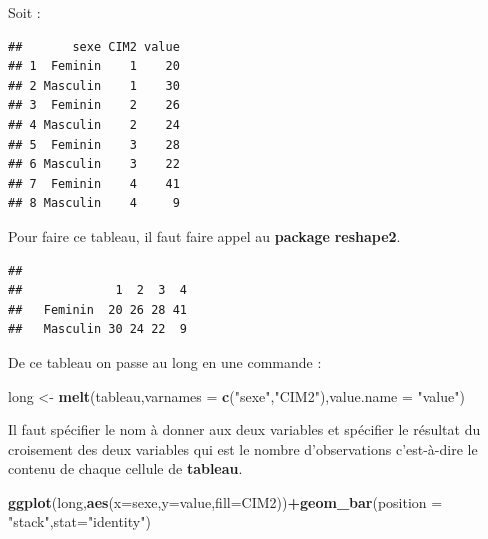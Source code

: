 \documentclass[
]{book}
\newenvironment{Shaded}{\begin{snugshade}}{\end{snugshade}}
\newcommand{\AttributeTok}[1]{\textcolor[rgb]{0.13,0.29,0.53}{#1}}
\newcommand{\FunctionTok}[1]{\textcolor[rgb]{0.13,0.29,0.53}{\textbf{#1}}}
\newcommand{\NormalTok}[1]{#1}
\newcommand{\OtherTok}[1]{\textcolor[rgb]{0.56,0.35,0.01}{#1}}
\newcommand{\SpecialCharTok}[1]{\textcolor[rgb]{0.81,0.36,0.00}{\textbf{#1}}}
\newcommand{\StringTok}[1]{\textcolor[rgb]{0.31,0.60,0.02}{#1}}
\begin{document}
Soit :

\begin{verbatim}
##       sexe CIM2 value
## 1  Feminin    1    20
## 2 Masculin    1    30
## 3  Feminin    2    26
## 4 Masculin    2    24
## 5  Feminin    3    28
## 6 Masculin    3    22
## 7  Feminin    4    41
## 8 Masculin    4     9
\end{verbatim}

Pour faire ce tableau, il faut faire appel au \textbf{package} \textbf{reshape2}.

\begin{Shaded}
\end{Shaded}

\begin{verbatim}
##           
##             1  2  3  4
##   Feminin  20 26 28 41
##   Masculin 30 24 22  9
\end{verbatim}

De ce tableau on passe au long en une commande :

\begin{Shaded}
\begin{Highlighting}[]
\NormalTok{long }\OtherTok{\textless{}{-}} \FunctionTok{melt}\NormalTok{(tableau,}\AttributeTok{varnames =} \FunctionTok{c}\NormalTok{(}\StringTok{"sexe"}\NormalTok{,}\StringTok{"CIM2"}\NormalTok{),}\AttributeTok{value.name =} \StringTok{"value"}\NormalTok{)}
\end{Highlighting}
\end{Shaded}

Il faut spécifier le nom à donner aux deux variables et spécifier le résultat
du croisement des deux variables qui est le nombre d'observations c'est-à-dire
le contenu de chaque cellule de \textbf{tableau}.

\begin{Shaded}
\begin{Highlighting}[]
\FunctionTok{ggplot}\NormalTok{(long,}\FunctionTok{aes}\NormalTok{(}\AttributeTok{x=}\NormalTok{sexe,}\AttributeTok{y=}\NormalTok{value,}\AttributeTok{fill=}\NormalTok{CIM2))}\SpecialCharTok{+}\FunctionTok{geom\_bar}\NormalTok{(}\AttributeTok{position =} \StringTok{"stack"}\NormalTok{,}\AttributeTok{stat=}\StringTok{"identity"}\NormalTok{)}
\end{Highlighting}
\end{Shaded}
\end{document}
